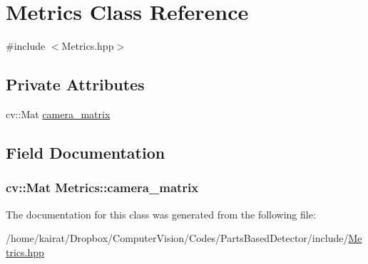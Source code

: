 \hypertarget{classMetrics}{}\section{Metrics Class Reference}
\label{classMetrics}


{\ttfamily \#include $<$Metrics.\+hpp$>$}

\subsection*{Private Attributes}
\begin{DoxyCompactItemize}
\item 
cv\+::\+Mat \hyperlink{classMetrics_aba72e7e31eb9057d1252e61cdf3aa904}{camera\+\_\+matrix}
\end{DoxyCompactItemize}


\subsection{Field Documentation}
\hypertarget{classMetrics_aba72e7e31eb9057d1252e61cdf3aa904}{}
\subsubsection[{camera\+\_\+matrix}]{\setlength{\rightskip}{0pt plus 5cm}cv\+::\+Mat Metrics\+::camera\+\_\+matrix\hspace{0.3cm}{\ttfamily [private]}}\label{classMetrics_aba72e7e31eb9057d1252e61cdf3aa904}


The documentation for this class was generated from the following file\+:\begin{DoxyCompactItemize}
\item 
/home/kairat/\+Dropbox/\+Computer\+Vision/\+Codes/\+Parts\+Based\+Detector/include/\hyperlink{Metrics_8hpp}{Metrics.\+hpp}\end{DoxyCompactItemize}
